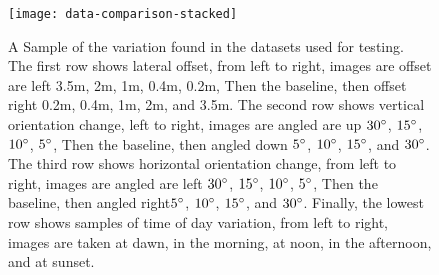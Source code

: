 \documentclass[letterpaper, 10 pt, conference]{ieeeconf}  %
\begin{document}
\begin{figure}[t]
    \centering
    \texttt{[image: data-comparison-stacked]}
    \caption{A Sample of the variation found in the datasets used for testing. The first row shows lateral offset, from left to right, images are offset are left 3.5m, 2m, 1m, 0.4m, 0.2m, Then the baseline, then offset right 0.2m, 0.4m, 1m, 2m, and 3.5m. The second row shows vertical orientation change,  left to right, images are angled are up $30\degree$, $15\degree$, $10\degree$, $5\degree$, Then the baseline, then angled down $5\degree$, $10\degree$, $15\degree$, and $30\degree$. The third row shows horizontal orientation change, from left to right, images are angled are left $30\degree$, $15\degree$, $10\degree$, $5\degree$, Then the baseline, then angled right$5\degree$, $10\degree$, $15\degree$, and $30\degree$. Finally, the lowest row shows samples of time of day variation, from left to right, images are taken at dawn, in the morning, at noon, in the afternoon, and at sunset.}
    \label{fig:dataset-example}
\end{figure}

%
%
%
\end{document}
